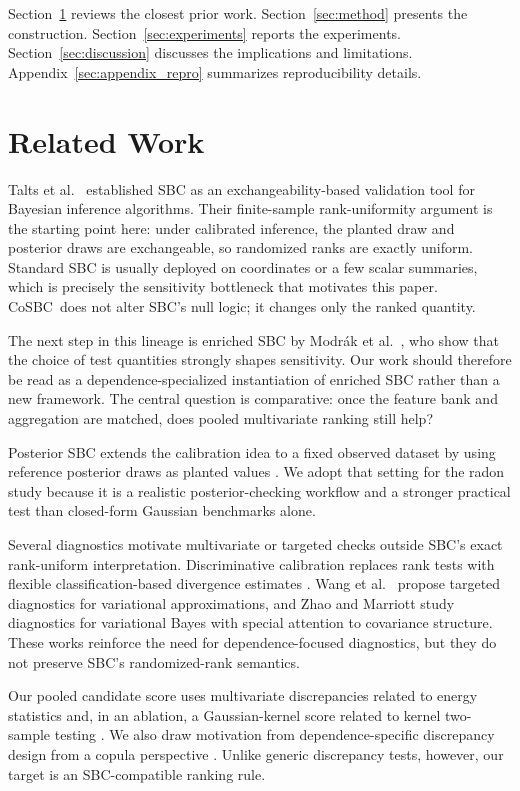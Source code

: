 \documentclass[10pt,twocolumn]{article}
\newcommand{\method}{CoSBC}
\newcommand{\1}{\mathbf{1}}
\begin{document}
Section~\ref{sec:related} reviews the closest prior work. Section~\ref{sec:method} presents the construction. Section~\ref{sec:experiments} reports the experiments. Section~\ref{sec:discussion} discusses the implications and limitations. Appendix~\ref{sec:appendix_repro} summarizes reproducibility details.

\section{Related Work}
\label{sec:related}
Talts et al.\ \cite{Talts2018} established SBC as an exchangeability-based validation tool for Bayesian inference algorithms. Their finite-sample rank-uniformity argument is the starting point here: under calibrated inference, the planted draw and posterior draws are exchangeable, so randomized ranks are exactly uniform. Standard SBC is usually deployed on coordinates or a few scalar summaries, which is precisely the sensitivity bottleneck that motivates this paper. \method\ does not alter SBC's null logic; it changes only the ranked quantity.

The next step in this lineage is enriched SBC by Modr\'ak et al.\ \cite{Modrak2023}, who show that the choice of test quantities strongly shapes sensitivity. Our work should therefore be read as a dependence-specialized instantiation of enriched SBC rather than a new framework. The central question is comparative: once the feature bank and aggregation are matched, does pooled multivariate ranking still help?

Posterior SBC extends the calibration idea to a fixed observed dataset by using reference posterior draws as planted values \cite{Sailynoja2025}. We adopt that setting for the radon study because it is a realistic posterior-checking workflow and a stronger practical test than closed-form Gaussian benchmarks alone.

Several diagnostics motivate multivariate or targeted checks outside SBC's exact rank-uniform interpretation. Discriminative calibration replaces rank tests with flexible classification-based divergence estimates \cite{YaoDomke2023}. Wang et al.\ \cite{Wang2023} propose targeted diagnostics for variational approximations, and Zhao and Marriott \cite{ZhaoMarriott2013} study diagnostics for variational Bayes with special attention to covariance structure. These works reinforce the need for dependence-focused diagnostics, but they do not preserve SBC's randomized-rank semantics.

Our pooled candidate score uses multivariate discrepancies related to energy statistics \cite{SzekelyRizzo2013} and, in an ablation, a Gaussian-kernel score related to kernel two-sample testing \cite{GrettonEtAl2012}. We also draw motivation from dependence-specific discrepancy design from a copula perspective \cite{AichAich2025}. Unlike generic discrepancy tests, however, our target is an SBC-compatible ranking rule.
\end{document}
